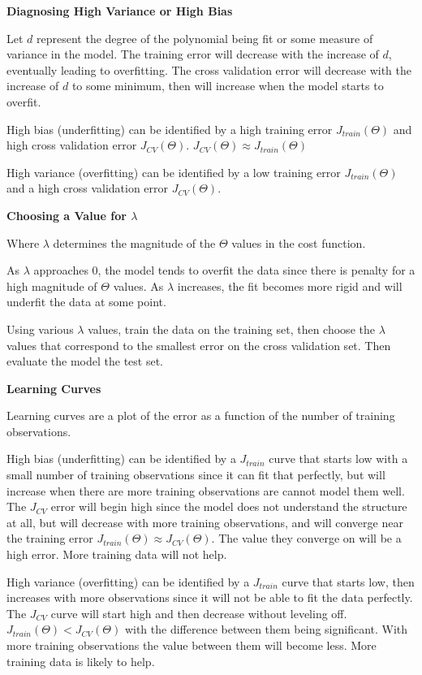\documentclass[
]{article}
\begin{document}
\textbf{Diagnosing High Variance or High Bias}

Let \(d\) represent the degree of the polynomial being fit or some
measure of variance in the model. The training error will decrease with
the increase of \(d\), eventually leading to overfitting. The cross
validation error will decrease with the increase of \(d\) to some
minimum, then will increase when the model starts to overfit.

High bias (underfitting) can be identified by a high training error
\(J_{train}(\Theta)\) and high cross validation error
\(J_{CV}(\Theta)\). \(J_{CV}(\Theta) \approx J_{train}(\Theta)\)

High variance (overfitting) can be identified by a low training error
\(J_{train}(\Theta)\) and a high cross validation error
\(J_{CV}(\Theta)\).

\textbf{Choosing a Value for \(\lambda\)}

Where \(\lambda\) determines the magnitude of the \(\Theta\) values in
the cost function.

As \(\lambda\) approaches 0, the model tends to overfit the data since
there is penalty for a high magnitude of \(\Theta\) values. As
\(\lambda\) increases, the fit becomes more rigid and will underfit the
data at some point.

Using various \(\lambda\) values, train the data on the training set,
then choose the \(\lambda\) values that correspond to the smallest error
on the cross validation set. Then evaluate the model the test set.

\textbf{Learning Curves}

Learning curves are a plot of the error as a function of the number of
training observations.

High bias (underfitting) can be identified by a \(J_{train}\) curve that
starts low with a small number of training observations since it can fit
that perfectly, but will increase when there are more training
observations are cannot model them well. The \(J_{CV}\) error will begin
high since the model does not understand the structure at all, but will
decrease with more training observations, and will converge near the
training error \(J_{train}(\Theta) \approx J_{CV}(\Theta)\). The value
they converge on will be a high error. More training data will not help.

High variance (overfitting) can be identified by a \(J_{train}\) curve
that starts low, then increases with more observations since it will not
be able to fit the data perfectly. The \(J_{CV}\) curve will start high
and then decrease without leveling off.
\(J_{train}(\Theta) < J_{CV}(\Theta)\) with the difference between them
being significant. With more training observations the value between
them will become less. More training data is likely to help.
\end{document}
